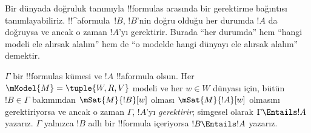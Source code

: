 



\begin{explain}
  Bir dünyada doğruluk tanımıyla !!{formula}s arasında bir gerektirme
  bağıntısı tanımlayabiliriz. !!^a{formula}~$!B$, $!B$'nin doğru olduğu her
  durumda $!A$ da doğruysa ve ancak o zaman $!A$'yı gerektirir. Burada ``her
  durumda'' hem ``hangi modeli ele alırsak alalım'' hem de ``o modelde hangi
  dünyayı ele alırsak alalım'' demektir.
\end{explain}

\begin{defn}
  $\Gamma$ bir !!{formula}s kümesi ve $!A$ !!a{formula} olsun. Her
  $\mModel{M} = \tuple{W, R, V}$ modeli ve her $w \in W$ dünyası için,
  bütün $!B \in \Gamma$ bakımından $\mSat{M}{!B}[w]$ olması
  $\mSat{M}{!A}[w]$ olmasını gerektiriyorsa ve ancak o zaman $\Gamma$,
  $!A$'yı \emph{gerektirir}; simgesel olarak $\Gamma \Entails !A$ yazarız.
  $\Gamma$ yalnızca $!B$ adlı bir !!{formula} içeriyorsa $!B \Entails !A$
  yazarız.
\end{defn}

